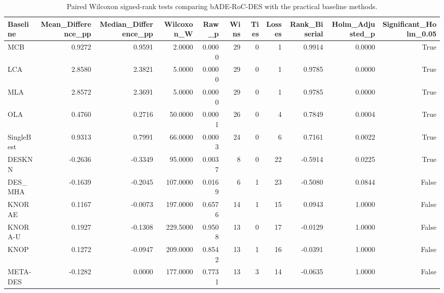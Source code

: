 \begin{table}
\caption{Paired Wilcoxon signed-rank tests comparing bADE-RoC-DES with the practical baseline methods.}
\label{tab:primary-wilcoxon}
\begin{tabular}{lrrrrrrrrrr}
\toprule
Baseline & Mean\_Difference\_pp & Median\_Difference\_pp & Wilcoxon\_W & Raw\_p & Wins & Ties & Losses & Rank\_Biserial & Holm\_Adjusted\_p & Significant\_Holm\_0.05 \\
\midrule
MCB & 0.9272 & 0.9591 & 2.0000 & 0.0000 & 29 & 0 & 1 & 0.9914 & 0.0000 & True \\
LCA & 2.8580 & 2.3821 & 5.0000 & 0.0000 & 29 & 0 & 1 & 0.9785 & 0.0000 & True \\
MLA & 2.8572 & 2.3691 & 5.0000 & 0.0000 & 29 & 0 & 1 & 0.9785 & 0.0000 & True \\
OLA & 0.4760 & 0.2716 & 50.0000 & 0.0001 & 26 & 0 & 4 & 0.7849 & 0.0004 & True \\
SingleBest & 0.9313 & 0.7991 & 66.0000 & 0.0003 & 24 & 0 & 6 & 0.7161 & 0.0022 & True \\
DESKNN & -0.2636 & -0.3349 & 95.0000 & 0.0037 & 8 & 0 & 22 & -0.5914 & 0.0225 & True \\
DES\_MHA & -0.1639 & -0.2045 & 107.0000 & 0.0169 & 6 & 1 & 23 & -0.5080 & 0.0844 & False \\
KNORAE & 0.1167 & -0.0073 & 197.0000 & 0.6576 & 14 & 1 & 15 & 0.0943 & 1.0000 & False \\
KNORA-U & 0.1927 & -0.1308 & 229.5000 & 0.9508 & 13 & 0 & 17 & -0.0129 & 1.0000 & False \\
KNOP & 0.1272 & -0.0947 & 209.0000 & 0.8542 & 13 & 1 & 16 & -0.0391 & 1.0000 & False \\
META-DES & -0.1282 & 0.0000 & 177.0000 & 0.7731 & 13 & 3 & 14 & -0.0635 & 1.0000 & False \\
\bottomrule
\end{tabular}
\end{table}
